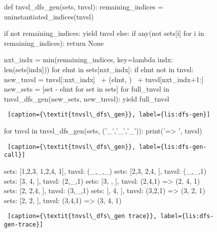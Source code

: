 \begin{figure}[htb]
    \centering
\begin{minipage}[c]{0.45\textwidth}
\begin{python1}  
def tnvsl_dfs_gen(sets, tnvsl):
  remaining_indices = uninstantiated_indices(tnvsl)

  if not remaining_indices: yield tnvsl
  else:
    if any(not sets[i] for i in remaining_indices):
      return None
      
    nxt_indx = min(remaining_indices,
                   key=lambda indx: len(sets[indx]))
    for elmt in sets[nxt_indx]:
      if elmt not in tnvsl:
        new_tnvsl = tnvsl[:nxt_indx] \
                    + (elmt, ) \
                    + tnvsl[nxt_indx+1:]
        new_sets = [set - {elmt} for set in sets]
        for full_tnvsl in tnvsl_dfs_gen(new_sets, 
                                        new_tnvsl):
          yield full_tnvsl
\end{python1}\linv
\begin{lstlisting} [caption={\textit{tnvsl\_dfs\_gen}}, label={lis:dfs-gen}]
\end{lstlisting}
\end{minipage}\linv
\end{figure}


\begin{figure}[htb]
    \centering
\begin{minipage}[c]{0.45\textwidth}
\begin{python1}  
for tnvsl in tnvsl_dfs_gen(sets, ('_','_','_')):
    print('=> ', tnvsl)
\end{python1}\linv
\begin{lstlisting} [caption={\textit{tnvsl\_dfs\_gen}}, label={lis:dfs-gen-call}]
\end{lstlisting}
\end{minipage}\linv
\end{figure}


\begin{figure}[!ht]
    \centering
\begin{minipage}[c]{0.45\textwidth}
\begin{python1}  
sets: [{1,2,3}, {1,2,4}, {1}], tnvsl: (_,_,_)
  sets: [{2,3}, {2,4}, {}], tnvsl: (_,_,1)
    sets: [{3}, {4}, {}], tnvsl: (2,_,1)
      sets: [{3}, {}, {}], tnvsl: (2,4,1)
=>  (2, 4, 1)
    sets: [{2}, {2,4}, {}], tnvsl: (3,_,1)
      sets: [{}, {4}, {}], tnvsl: (3,2,1)
=>  (3, 2, 1)
      sets: [{2}, {2}, {}], tnvsl: (3,4,1)
=>  (3, 4, 1)
\end{python1}\linv
\begin{lstlisting} [caption={\textit{tnvsl\_dfs\_gen trace}}, label={lis:dfs-gen-trace}]
\end{lstlisting}
\end{minipage}\linv
\end{figure}

